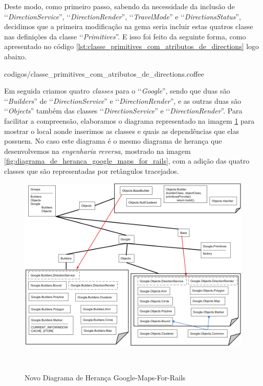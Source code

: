 Deste modo, como primeiro passo, sabendo da necessidade da inclusão de ‘‘\emph{DirectionService}'',
‘‘\emph{DirectionRender}'', ‘‘\emph{TravelMode}'' e ‘‘\emph{DirectionsStatus}'', decidimos que a primeira
modificação na gema seria  incluir estas quatros classe nas definições da classe ‘‘\emph{Primitives}''.
E isso foi feito da seguinte forma, como apresentado no código
\ref{lst:classe_primitives_com_atributos_de_directions} logo abaixo.


{codigos/classe_primitives_com_atributos_de_directions.coffee}

Em seguida criamos quatro \emph{classes} para o ‘‘\emph{Google}'', sendo que duas são ‘‘\emph{Builders}'' de 
‘‘\emph{DirectionService}'' e ‘‘\emph{DirectionRender}'', e as outras duas são ‘‘\emph{Objects}'' também das 
classes ‘‘\emph{DirectionService}'' e ‘‘\emph{DirectionRender}''. Para facilitar a compreensão, elaboramos o 
diagrama representado na imagem \ref{fig:novo_diagrama_de_heranca_google_maps_for_rails} para mostrar o
local aonde inserimos as classes e quais as dependências que elas possuem. No caso este diagrama é o mesmo
diagrama de herança que desenvolvemos na \emph{engenharia reversa}, mostrado na imagem
\ref{fig:diagrama_de_heranca_google_maps_for_rails}, com a adição das quatro classes que são representadas 
por retângulos tracejados.

\begin{figure}[ht]
  \begin{center}
    \includegraphics[scale=0.35]{images/novo_diagrama_de_heranca_google_maps_for_rails.png}
    \caption{Novo Diagrama de Herança Google-Maps-For-Rails}
    \label{fig:novo_diagrama_de_heranca_google_maps_for_rails}
  \end{center}  \
\end{figure}

